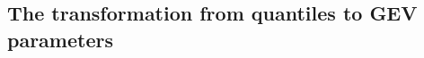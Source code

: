 






%
\subsection{The transformation from quantiles to GEV parameters}
\label{section:transformation}
%

